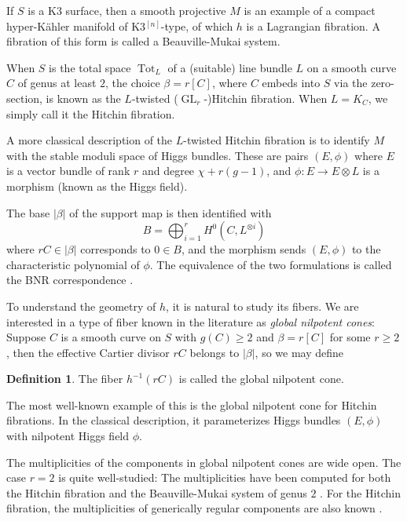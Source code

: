 \documentclass{amsart}
\theoremstyle{plain}
\theoremstyle{definition}
\newtheorem{definition}{Definition}[section]
\theoremstyle{remark}
\begin{document}
If $S$ is a K3 surface, then a smooth projective $M$ is an example of a compact hyper-K\"ahler manifold of K3${}^{[n]}$-type, of which $h$ is a Lagrangian fibration.
A fibration of this form is called a Beauville-Mukai system.

When $S$ is the total space $\operatorname{Tot}_L$ of a (suitable) line bundle $L$ on a smooth curve $C$ of genus at least $2$, the choice $\beta=r[C]$, where $C$ embeds into $S$ via the zero-section, is known as the $L$-twisted ($\operatorname{GL}_r$-)Hitchin fibration.
When $L=K_C$, we simply call it the Hitchin fibration.

A more classical description of the $L$-twisted Hitchin fibration is to identify $M$ with the stable moduli space of Higgs bundles.
These are pairs $(E,\phi)$ where $E$ is a vector bundle of rank $r$ and degree $\chi+r(g-1)$, and $\phi:E\to E\otimes L$ is a morphism (known as the Higgs field).

The base $|\beta|$ of the support map is then identified with
\[B=\bigoplus_{i=1}^r H^0(C,L^{\otimes i})\]
where $rC\in |\beta|$ corresponds to $0\in B$, and the morphism sends $(E,\phi)$ to the characteristic polynomial of $\phi$.
The equivalence of the two formulations is called the BNR correspondence \cite{bnr}.

To understand the geometry of $h$, it is natural to study its fibers.
We are interested in a type of fiber known in the literature as \emph{global nilpotent cones}:
Suppose $C$ is a smooth curve on $S$ with $g(C)\ge 2$ and $\beta=r[C]$ for some $r\ge 2$, then the effective Cartier divisor $rC$ belongs to $|\beta|$, so we may define
\begin{definition}
    The fiber $h^{-1}(rC)$ is called the global nilpotent cone.
\end{definition}

The most well-known example of this is the global nilpotent cone for Hitchin fibrations.
In the classical description, it parameterizes Higgs bundles $(E,\phi)$ with nilpotent Higgs field $\phi$.

The multiplicities of the components in global nilpotent cones are wide open.
The case $r=2$ is quite well-studied:
The multiplicities have been computed for both the Hitchin fibration \cite{hitchin19} and the Beauville-Mukai system of genus $2$ \cite{hellman21}.
For the Hitchin fibration, the multiplicities of generically regular components are also known \cite{HH}.
\end{document}
